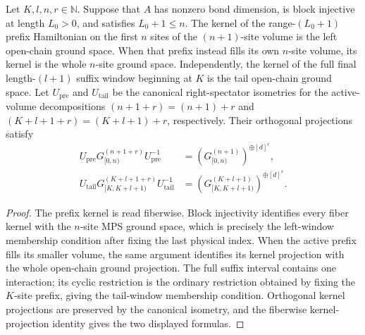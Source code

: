 \begin{lemma}
    \label{thm:fixed-volume-c3-projector-conjugacy}
    \leanok
    Let $K,l,n,r\in\mathbb{N}$.  Suppose that $A$ has nonzero bond dimension,
    is block injective at length $L_0>0$, and satisfies $L_0+1\leq n$.  The
    kernel of the range-$(L_0+1)$ prefix Hamiltonian on the first $n$ sites of
    the $(n+1)$-site volume is the left open-chain ground space.  When that
    prefix instead fills its own $n$-site volume, its kernel is the whole
    $n$-site ground space.  Independently,
    the kernel of the full final length-$(l+1)$ suffix window beginning at $K$
    is the tail open-chain ground space.  Let $U_{\mathrm{pre}}$ and
    $U_{\mathrm{tail}}$ be the canonical right-spectator isometries for the
    active-volume decompositions $(n+1+r)=(n+1)+r$ and
    $(K+l+1+r)=(K+l+1)+r$, respectively.  Their orthogonal projections satisfy
    \begin{align}
        U_{\mathrm{pre}} G_{\lbrack 0,n)}^{(n+1+r)}U_{\mathrm{pre}}^{-1}
         & =(G_{\lbrack 0,n)}^{(n+1)})^{\oplus{[d]}^r},       \\
        U_{\mathrm{tail}} G_{\lbrack K,K+l+1)}^{(K+l+1+r)}U_{\mathrm{tail}}^{-1}
         & =(G_{\lbrack K,K+l+1)}^{(K+l+1)})^{\oplus{[d]}^r}.
    \end{align}
\end{lemma}

\begin{proof}
    \leanok
    The prefix kernel is read fiberwise.  Block injectivity identifies every
    fiber kernel with the $n$-site MPS ground space, which is precisely the
    left-window membership condition after fixing the last physical index.
    When the active prefix fills its smaller volume, the same argument
    identifies its kernel projection with the whole open-chain ground
    projection.  The full suffix interval contains one interaction; its cyclic
    restriction
    is the ordinary restriction obtained by fixing the $K$-site prefix, giving
    the tail-window membership condition.  Orthogonal kernel projections are
    preserved by the canonical isometry, and the fiberwise kernel-projection
    identity gives the two displayed formulas.
\end{proof}

